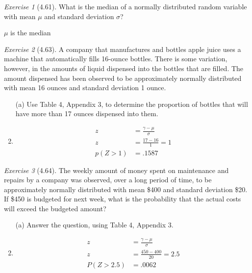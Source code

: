 \documentclass[12pt]{amsart}
\makeatletter
\theoremstyle{remark}
\newtheorem*{exercise}{Exercise}%
\renewenvironment{proof}[1][\proofname]{\par\doublespacing
  \pushQED{\qed}%
  \normalfont \topsep6\p@\@plus6\p@\relax
  \list{}{%
    \settowidth{\leftmargin}{\itshape\proofname:\hskip\labelsep}%
    \setlength{\labelwidth}{0pt}%
    \setlength{\itemindent}{-\leftmargin}%
  }%
  \item[\hskip\labelsep\itshape#1\@addpunct{:}]\ignorespaces
}{%
  \popQED\endlist\@endpefalse
  \singlespacing
}
\theoremstyle{mycomment}
\makeatother
\begin{document}
\begin{exercise}[4.61]
What is the median of a normally distributed random variable with mean $\mu$ and standard deviation $\sigma$?

\begin{proof}[Solution]
$\mu$ is the median 
\end{proof}
\end{exercise}

\begin{exercise}[4.63]
A company that manufactures and bottles apple juice uses a machine that automatically fills 16-ounce bottles. There is some variation, however, in the amounts of liquid dispensed into the bottles that are filled. The amount dispensed has been observed to be approximately normally distributed with mean 16 ounces and standard deviation 1 ounce.

\begin{enumerate}
    \item[(a)] Use Table 4, Appendix 3, to determine the proportion of bottles that will have more than 17 ounces dispensed into them.
\begin{proof}[Solution]
	\begin{align*}
		z &= \frac{\gamma - \mu}{\sigma} \\
		z &= \frac{17-16}{1} = 1 \\
		p(Z > 1) &= .1587
	\end{align*}
\end{proof}
\end{enumerate}
\end{exercise}

\begin{exercise}[4.64]
The weekly amount of money spent on maintenance and repairs by a company was observed, over a long period of time, to be approximately normally distributed with mean \$400 and standard deviation \$20. If \$450 is budgeted for next week, what is the probability that the actual costs will exceed the budgeted amount?

\begin{enumerate}
    \item[(a)] Answer the question, using Table 4, Appendix 3.
\begin{proof}[Solution]
	\begin{align*}
		z &= \frac{\gamma - \mu}{\sigma} \\
		z &= \frac{450 - 400}{20} = 2.5 \\
		P(Z > 2.5) &= .0062
	\end{align*}
\end{proof}
\end{enumerate}
\end{exercise}
\end{document}
